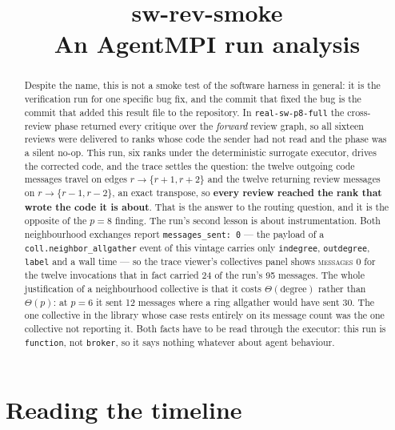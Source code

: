 \documentclass[11pt]{article}
\title{\textbf{sw-rev-smoke}\\[2pt]\large An AgentMPI run analysis}
\author{}
\date{}
\begin{document}
\maketitle

\begin{abstract}
Despite the name, this is not a smoke test of the software harness in general: it is the
verification run for one specific bug fix, and the commit that fixed the bug is the commit
that added this result file to the repository. In \texttt{real-sw-p8-full} the cross-review
phase returned every critique over the \emph{forward} review graph, so all sixteen reviews
were delivered to ranks whose code the sender had not read and the phase was a silent no-op.
This run, six ranks under the deterministic surrogate executor, drives the corrected code, and
the trace settles the question: the twelve outgoing code messages travel on edges
$r \rightarrow \{r{+}1, r{+}2\}$ and the twelve returning review messages on
$r \rightarrow \{r{-}1, r{-}2\}$, an exact transpose, so \textbf{every review reached the rank
that wrote the code it is about}. That is the answer to the routing question, and it is the
opposite of the $p=8$ finding. The run's second lesson is about instrumentation. Both
neighbourhood exchanges report \texttt{messages\_sent: 0} --- the payload of a
\texttt{coll.neighbor\_allgather} event of this vintage carries only \texttt{indegree},
\texttt{outdegree}, \texttt{label} and a wall time --- so the trace viewer's collectives panel
shows \textsc{messages} 0 for the twelve invocations that in fact carried 24 of the run's 95
messages. The whole justification of a neighbourhood collective is that it costs $\Theta(\text{degree})$
rather than $\Theta(p)$: at $p=6$ it sent 12 messages where a ring allgather would have sent
30. The one collective in the library whose case rests entirely on its message count was the
one collective not reporting it. Both facts have to be read through the executor: this run is
\texttt{function}, not \texttt{broker}, so it says nothing whatever about agent behaviour.
\end{abstract}



\section{Reading the timeline}
\end{document}
